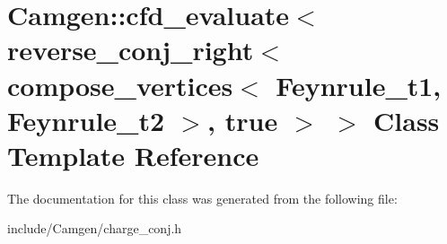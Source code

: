 \hypertarget{a00059}{}\section{Camgen\+:\+:cfd\+\_\+evaluate$<$ reverse\+\_\+conj\+\_\+right$<$ compose\+\_\+vertices$<$ Feynrule\+\_\+t1, Feynrule\+\_\+t2 $>$, true $>$ $>$ Class Template Reference}
\label{a00059}


The documentation for this class was generated from the following file\+:\begin{DoxyCompactItemize}
\item 
include/\+Camgen/charge\+\_\+conj.\+h\end{DoxyCompactItemize}
